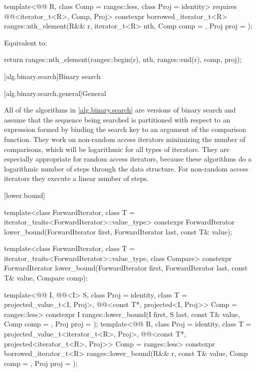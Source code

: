 \begin{itemdecl}
template<@@ R, class Comp = ranges::less, class Proj = identity>
  requires @@<iterator_t<R>, Comp, Proj>
  constexpr borrowed_iterator_t<R>
    ranges::nth_element(R&& r, iterator_t<R> nth, Comp comp = {}, Proj proj = {});
\end{itemdecl}

\begin{itemdescr}
\pnum
\effects
Equivalent to:
\begin{codeblock}
return ranges::nth_element(ranges::begin(r), nth, ranges::end(r), comp, proj);
\end{codeblock}
\end{itemdescr}

[alg.binary.search]{Binary search}

[alg.binary.search.general]{General}

\pnum
All of the algorithms in \ref{alg.binary.search} are versions of binary search and
assume that the sequence being searched
is partitioned with respect to an expression
formed by binding the search key to an argument of the comparison function.
They work on non-random access iterators minimizing the number of comparisons,
which will be logarithmic for all types of iterators.
They are especially appropriate for random access iterators,
because these algorithms do a logarithmic number of steps
through the data structure.
For non-random access iterators they execute a linear number of steps.

[lower.bound]{}

%
\begin{itemdecl}
template<class ForwardIterator, class T = iterator_traits<ForwardIterator>::value_type>
  constexpr ForwardIterator
    lower_bound(ForwardIterator first, ForwardIterator last,
                const T& value);

template<class ForwardIterator, class T = iterator_traits<ForwardIterator>::value_type,
         class Compare>
  constexpr ForwardIterator
    lower_bound(ForwardIterator first, ForwardIterator last,
                const T& value, Compare comp);

template<@@ I, @@<I> S, class Proj = identity,
         class T = projected_value_t<I, Proj>,
         @@<const T*, projected<I, Proj>> Comp = ranges::less>
  constexpr I ranges::lower_bound(I first, S last, const T& value, Comp comp = {},
                                  Proj proj = {});
template<@@ R, class Proj = identity,
         class T = projected_value_t<iterator_t<R>, Proj>,
         @@<const T*, projected<iterator_t<R>, Proj>> Comp =
           ranges::less>
  constexpr borrowed_iterator_t<R>
    ranges::lower_bound(R&& r, const T& value, Comp comp = {}, Proj proj = {});
\end{itemdecl}

